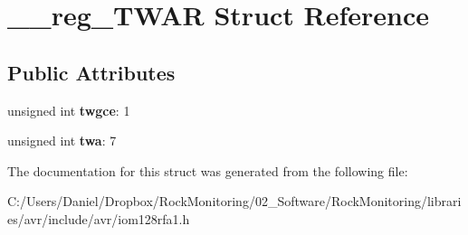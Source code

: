 \hypertarget{struct____reg___t_w_a_r}{}\section{\+\_\+\+\_\+reg\+\_\+\+T\+W\+AR Struct Reference}
\label{struct____reg___t_w_a_r}
\subsection*{Public Attributes}
\begin{DoxyCompactItemize}
\item 
unsigned int {\bfseries twgce}\+: 1\hypertarget{struct____reg___t_w_a_r_ad92095002f927330a0d50dec535e7141}{}\label{struct____reg___t_w_a_r_ad92095002f927330a0d50dec535e7141}

\item 
unsigned int {\bfseries twa}\+: 7\hypertarget{struct____reg___t_w_a_r_a1825ab77140e3f0f8b3d5f99ad805b26}{}\label{struct____reg___t_w_a_r_a1825ab77140e3f0f8b3d5f99ad805b26}

\end{DoxyCompactItemize}


The documentation for this struct was generated from the following file\+:\begin{DoxyCompactItemize}
\item 
C\+:/\+Users/\+Daniel/\+Dropbox/\+Rock\+Monitoring/02\+\_\+\+Software/\+Rock\+Monitoring/libraries/avr/include/avr/iom128rfa1.\+h\end{DoxyCompactItemize}
